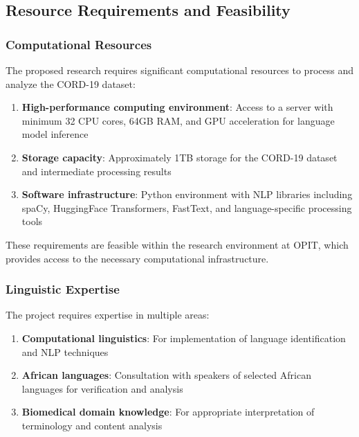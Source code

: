 \documentclass[
]{article}
\providecommand{\tightlist}{%
  \setlength{\itemsep}{0pt}\setlength{\parskip}{0pt}}\usepackage{longtable,booktabs,array}
\begin{document}
\subsection{Resource Requirements and
Feasibility}\label{resource-requirements-and-feasibility}

\subsubsection{Computational Resources}\label{computational-resources}

The proposed research requires significant computational resources to
process and analyze the CORD-19 dataset:

\begin{enumerate}
\def\labelenumi{\arabic{enumi}.}
\tightlist
\item
  \textbf{High-performance computing environment}: Access to a server
  with minimum 32 CPU cores, 64GB RAM, and GPU acceleration for language
  model inference
\item
  \textbf{Storage capacity}: Approximately 1TB storage for the CORD-19
  dataset and intermediate processing results
\item
  \textbf{Software infrastructure}: Python environment with NLP
  libraries including spaCy, HuggingFace Transformers, FastText, and
  language-specific processing tools
\end{enumerate}

These requirements are feasible within the research environment at OPIT,
which provides access to the necessary computational infrastructure.

\subsubsection{Linguistic Expertise}\label{linguistic-expertise}

The project requires expertise in multiple areas:

\begin{enumerate}
\def\labelenumi{\arabic{enumi}.}
\tightlist
\item
  \textbf{Computational linguistics}: For implementation of language
  identification and NLP techniques
\item
  \textbf{African languages}: Consultation with speakers of selected
  African languages for verification and analysis
\item
  \textbf{Biomedical domain knowledge}: For appropriate interpretation
  of terminology and content analysis
\end{enumerate}
\end{document}
